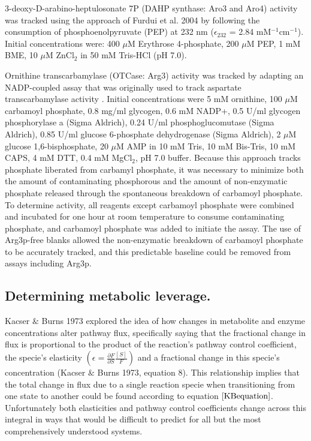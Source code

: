 3-deoxy-D-arabino-heptulosonate 7P (DAHP synthase: Aro3 and Aro4) activity was tracked using the approach of Furdui et al. 2004 \cite{Furdui:2004bk} by following the consumption of phosphoenolpyruvate (PEP) at 232 nm ($\epsilon_{232}$ = 2.84 mM$^{-1}$cm$^{-1}$). Initial concentrations were: 400 $\mu$M Erythrose 4-phosphate, 200 $\mu$M PEP, 1 mM BME, 10 $\mu$M ZnCl$_{2}$ in 50 mM Tris-HCl (pH 7.0).  

Ornithine transcarbamylase (OTCase: Arg3) activity was tracked by adapting an NADP-coupled assay that was originally used to track aspartate transcarbamylase activity \cite{Foote:1981to}. Initial concentrations were 5 mM ornithine, 100 $\mu$M carbamoyl phosphate, 0.8 mg/ml glycogen, 0.6 mM NADP+, 0.5 U/ml glycogen phosphorylase a (Sigma Aldrich), 0.24 U/ml phosphoglucomutase (Sigma Aldrich), 0.85 U/ml glucose 6-phosphate dehydrogenase (Sigma Aldrich), 2 $\mu$M glucose 1,6-bisphosphate, 20 $\mu$M AMP in 10 mM Tris, 10 mM Bis-Tris, 10 mM CAPS, 4 mM DTT, 0.4 mM MgCl$_{2}$, pH 7.0 buffer.  Because this approach tracks phosphate liberated from carbamyl phosphate, it was necessary to minimize both the amount of contaminating phosphorous and the amount of non-enzymatic phosphate released through the spontaneous breakdown of carbamoyl phosphate.  To determine activity, all reagents except carbamoyl phosphate were combined and incubated for one hour at room temperature to consume contaminating phosphate, and carbamoyl phosphate was added to initiate the assay.  The use of Arg3p-free blanks allowed the non-enzymatic breakdown of carbamoyl phosphate to be accurately tracked, and this predictable baseline could be removed from assays including Arg3p. 

\subsection{Determining metabolic leverage.}

Kacser $\&$ Burns 1973 \cite{main-Kacser:1973fe} explored the idea of how changes in metabolite and enzyme concentrations alter pathway flux, specifically saying that the fractional change in flux is proportional to the product of the reaction's pathway control coefficient, the specie's elasticity $\left(\epsilon = \frac{\partial F}{\partial S}\frac{[S]}{F}\right)$ and a fractional change in this specie's concentration (Kacser $\&$ Burns 1973, equation 8).  This relationship implies that the total change in flux due to a single reaction specie when transitioning from one state to another could be found according to equation $\ref{KBequation}$.  Unfortunately both elasticities and pathway control coefficients change across this integral in ways that would be difficult to predict for all but the most comprehensively understood systems.

